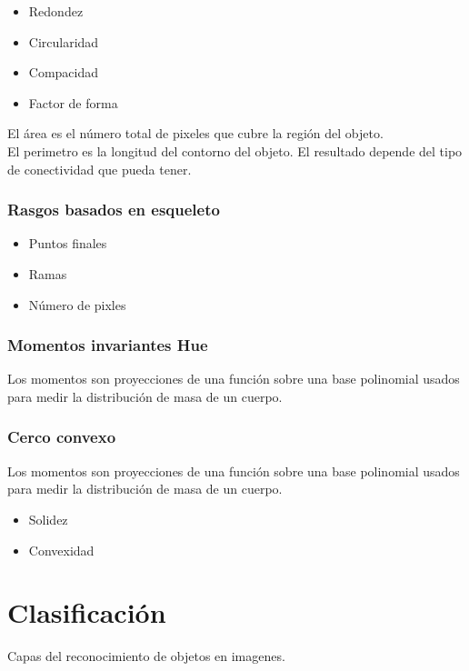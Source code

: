 \documentclass[a4paper, 11pt]{article}
\begin{document}
\begin{itemize}
\item Redondez
\item Circularidad
\item Compacidad
\item Factor de forma
\end{itemize}

El área es el número total de pixeles que cubre la región del objeto.\\

El perimetro es la longitud del contorno del objeto. El resultado depende del tipo de conectividad que pueda tener.

\subsubsection{Rasgos basados en esqueleto}

\begin{itemize}
\item Puntos finales
\item Ramas
\item Número de pixles
\end{itemize}

\subsubsection{Momentos invariantes Hue}

Los momentos son proyecciones de una función sobre una base polinomial usados para medir la distribución de masa de un cuerpo.

\subsubsection{Cerco convexo}

Los momentos son proyecciones de una función sobre una base polinomial usados para medir la distribución de masa de un cuerpo.

\begin{itemize}
\item Solidez
\item Convexidad
\end{itemize}

\pagebreak
\section{Clasificación}

Capas del reconocimiento de objetos en imagenes.
\end{document}
